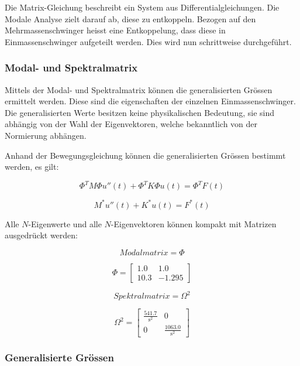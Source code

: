 \documentclass[
  letterpaper,
  DIV=11]{scrreprt}
\begin{document}
Die Matrix-Gleichung beschreibt ein System aus Differentialgleichungen.
Die Modale Analyse zielt darauf ab, diese zu entkoppeln. Bezogen auf den
Mehrmassenschwinger heisst eine Entkoppelung, dass diese in
Einmassenschwinger aufgeteilt werden. Dies wird nun schrittweise
durchgeführt.

\hypertarget{modal--und-spektralmatrix}{%
\subsubsection{Modal- und
Spektralmatrix}\label{modal--und-spektralmatrix}}

Mittels der Modal- und Spektralmatrix können die generalisierten Grössen
ermittelt werden. Diese sind die eigenschaften der einzelnen
Einmassenschwinger. Die generalisierten Werte besitzen keine
physikalischen Bedeutung, sie sind abhängig von der Wahl der
Eigenvektoren, welche bekanntlich von der Normierung abhängen.

Anhand der Bewegungsgleichung können die generalisierten Grössen
bestimmt werden, es gilt:

\[\Phi^T M \Phi u''(t) + \Phi^T K \Phi u(t) = \Phi^T F(t)\]

\[M^*u''(t) + K^* u(t) = F^* (t)\]

Alle \(N\)-Eigenwerte und alle \(N\)-Eigenvektoren können kompakt mit
Matrizen ausgedrückt werden:

\begin{equation}Modalmatrix = \Phi\end{equation}

\begin{equation}\Phi = \left[\begin{matrix}1.0 & 1.0\\10.3 & -1.295\end{matrix}\right]\end{equation}

\begin{equation}Spektralmatrix = \Omega^{2}\end{equation}

\begin{equation}\Omega^{2} = \left[\begin{matrix}\frac{541.7}{\text{s}^{2}} & 0\\0 & \frac{1063.0}{\text{s}^{2}}\end{matrix}\right]\end{equation}

\hypertarget{generalisierte-gruxf6ssen}{%
\subsubsection{Generalisierte Grössen}\label{generalisierte-gruxf6ssen}}
\end{document}
